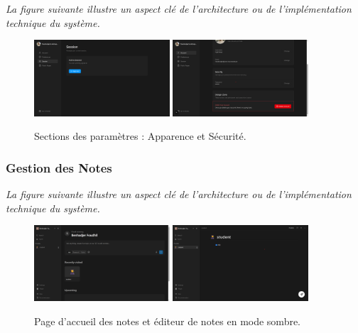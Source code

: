 \noindent
\textit{La figure suivante illustre un aspect clé de l'architecture ou de l'implémentation technique du système.}
\begin{figure}[H]
    \centering
    \includegraphics[width=0.45\textwidth]{assets/docs/web/dashboard-appearence-section.png}
    \hfill
    \includegraphics[width=0.45\textwidth]{assets/docs/web/dashboard-page-security-section.png}
    \caption{Sections des paramètres : Apparence et Sécurité.}
    \label{fig:web-settings}
\end{figure}

\subsubsection{Gestion des Notes}
\noindent
\textit{La figure suivante illustre un aspect clé de l'architecture ou de l'implémentation technique du système.}
\begin{figure}[H]
    \centering
    \includegraphics[width=0.45\textwidth]{assets/docs/web/note-homepage.png}
    \hfill
    \includegraphics[width=0.45\textwidth]{assets/docs/web/note-page-dark.png}
    \caption{Page d'accueil des notes et éditeur de notes en mode sombre.}
    \label{fig:web-notes}
\end{figure}

